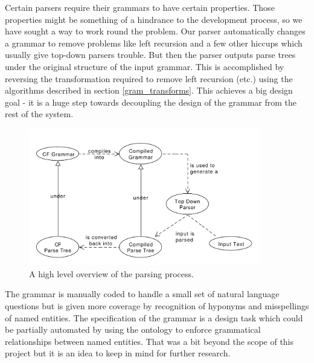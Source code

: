 \documentclass[11pt]{article}
\begin{document}
{Certain parsers require their grammars to have certain properties. Those properties
might be something of a hindrance to the development process, so we have sought
a way to work round the problem. Our parser automatically changes a grammar
to remove problems like left recursion and a few other hiccups which usually 
give top-down parsers trouble. But then the parser outputs
parse trees under the original structure of the input grammar.
This is accomplished by reversing the transformation required to remove left
recursion (etc.) using the algorithms described in section \ref{gram_transforms}.
This achieves a big design goal - it is a huge step towards decoupling the
design of the grammar from the rest of the system.

\begin{figure}[h!]
    \centering
    \includegraphics[width=0.9\textwidth,natwidth=1,natheight=1]{umlet/high_level.pdf}
    \caption{A high level overview of the parsing process.}
    \label{fig:high_level_parse}
\end{figure}

The grammar is manually coded to handle a small set of natural language questions
but is given more coverage by recognition of hyponyms and misspellings of named entities.
The specification of the grammar is a design task which could be partially automated by
using the ontology to enforce grammatical relationships between named entities. That
was a bit beyond the scope of this project but it is an idea to keep in mind for further
research.

\begin{figure}[h!]


\end{figure}}
\end{document}
